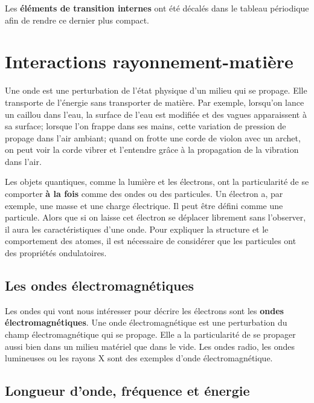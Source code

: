 \documentclass[
  11pt,
  a4paper,
  openany]{book}
\begin{document}
Les \textbf{éléments de transition internes} ont été décalés dans le tableau périodique afin de rendre ce dernier plus compact.

\newpage

\hypertarget{interactions-rayonnement-matiuxe8re}{%
\section{Interactions rayonnement-matière}\label{interactions-rayonnement-matiuxe8re}}

Une onde est une perturbation de l'état physique d'un milieu qui se propage. Elle transporte de l'énergie sans transporter de matière. Par exemple, lorsqu'on lance un caillou dans l'eau, la surface de l'eau est modifiée et des vagues apparaissent à sa surface; lorsque l'on frappe dans ses mains, cette variation de pression de propage dans l'air ambiant; quand on frotte une corde de violon avec un archet, on peut voir la corde vibrer et l'entendre grâce à la propagation de la vibration dans l'air.

Les objets quantiques, comme la lumière et les électrons, ont la particularité de se comporter \textbf{à la fois} comme des ondes ou des particules. Un électron a, par exemple, une masse et une charge électrique. Il peut être défini comme une particule. Alors que si on laisse cet électron se déplacer librement sans l'observer, il aura les caractéristiques d'une onde. Pour expliquer la structure et le comportement des atomes, il est nécessaire de considérer que les particules ont des propriétés ondulatoires.

\hypertarget{les-ondes-uxe9lectromagnuxe9tiques}{%
\subsection{Les ondes électromagnétiques}\label{les-ondes-uxe9lectromagnuxe9tiques}}

Les ondes qui vont nous intéresser pour décrire les électrons sont les \textbf{ondes électromagnétiques}. Une onde électromagnétique est une perturbation du champ électromagnétique qui se propage. Elle a la particularité de se propager aussi bien dans un milieu matériel que dans le vide. Les ondes radio, les ondes lumineuses ou les rayons X sont des exemples d'onde électromagnétique.

\hypertarget{longueur-donde-fruxe9quence-et-uxe9nergie}{%
\subsection{Longueur d'onde, fréquence et énergie}\label{longueur-donde-fruxe9quence-et-uxe9nergie}}
\end{document}
